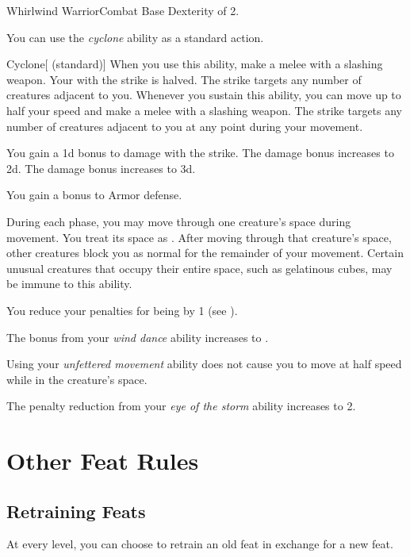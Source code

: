     \begin{feat}{Whirlwind Warrior}{Combat}
        \featpres Base Dexterity of 2.

         You can use the \textit{cyclone} ability as a standard action.
        \begin{freeability}{Cyclone}[ (standard)]
            When you use this ability, make a melee  with a slashing weapon.
            Your  with the strike is halved.
            The strike targets any number of creatures adjacent to you.
            Whenever you sustain this ability, you can move up to half your speed and make a melee  with a slashing weapon.
            The strike targets any number of creatures adjacent to you at any point during your movement.

            \rankline
             You gain a \plus1d bonus to damage with the strike.
             The damage bonus increases to \plus2d.
             The damage bonus increases to \plus3d.
        \end{freeability}

         You gain a  bonus to Armor defense.

         During each phase, you may move through one creature's space during movement.
        You treat its space as .
        After moving through that creature's space, other creatures block you as normal for the remainder of your movement.
        Certain unusual creatures that occupy their entire space, such as gelatinous cubes, may be immune to this ability.

         You reduce your penalties for being  by 1 (see ).

         The bonus from your \textit{wind dance} ability increases to .

         Using your \textit{unfettered movement} ability does not cause you to move at half speed while in the creature's space.

         The penalty reduction from your \textit{eye of the storm} ability increases to 2.
    \end{feat}

\section{Other Feat Rules}

    \subsection{Retraining Feats}
        At every level, you can choose to retrain an old feat in exchange for a new feat.
